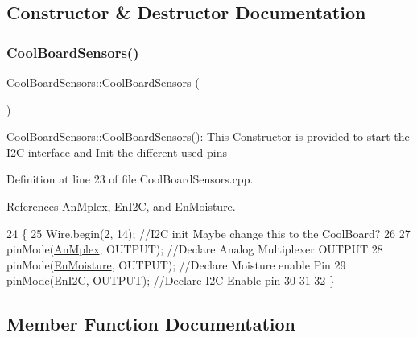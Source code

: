\subsection{Constructor \& Destructor Documentation}
\mbox{\label{classCoolBoardSensors_a91ff2a02f5486f90cf2413a1cf8a9ed4}} 
\subsubsection{\texorpdfstring{Cool\+Board\+Sensors()}{CoolBoardSensors()}}
{\footnotesize\ttfamily Cool\+Board\+Sensors\+::\+Cool\+Board\+Sensors (\begin{DoxyParamCaption}{ }\end{DoxyParamCaption})}

\hyperlink{classCoolBoardSensors_a91ff2a02f5486f90cf2413a1cf8a9ed4}{Cool\+Board\+Sensors\+::\+Cool\+Board\+Sensors()}\+: This Constructor is provided to start the I2C interface and Init the different used pins 

Definition at line 23 of file Cool\+Board\+Sensors.\+cpp.



References An\+Mplex, En\+I2C, and En\+Moisture.


\begin{DoxyCode}
24 \{
25     Wire.begin(2, 14);                       \textcolor{comment}{//I2C init Maybe change this to the CoolBoard?}
26 
27     pinMode(\hyperlink{classCoolBoardSensors_a12ef28b1046219e0aee10bf64e28c4a5}{AnMplex}, OUTPUT);                \textcolor{comment}{//Declare Analog Multiplexer OUTPUT}
28     pinMode(\hyperlink{classCoolBoardSensors_a6177d02e14a057a2f171a2e930b5038d}{EnMoisture}, OUTPUT);             \textcolor{comment}{//Declare Moisture enable Pin}
29     pinMode(\hyperlink{classCoolBoardSensors_aaa6b5dbf3a6633bffd9d204d961096dc}{EnI2C}, OUTPUT);           \textcolor{comment}{//Declare I2C Enable pin }
30 
31 
32 \}
\end{DoxyCode}


\subsection{Member Function Documentation}
\mbox{\label{classCoolBoardSensors_aa432c5aac88f89c31a10766390f23e0b}} 
